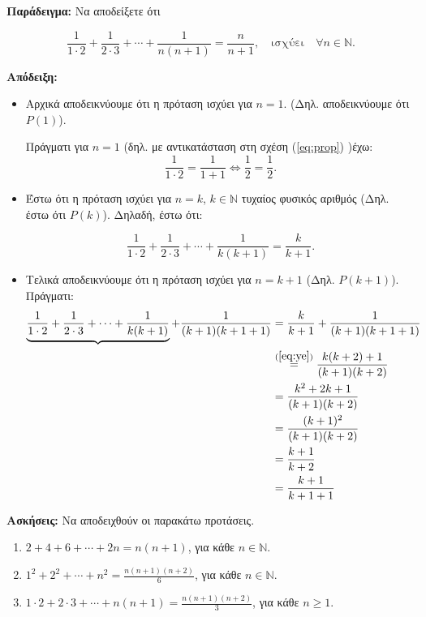 \documentclass[a4paper,12pt]{article}
\begin{document}
\thispagestyle{empty}

\begin{center}
\end{center}

\vspace{1cm}


\textbf{Παράδειγμα:} Να αποδείξετε ότι 

\begin{equation}\label{eq:prop}
\frac{1}{1\cdot 2}+\frac{1}{2\cdot 3}+\cdots + \frac{1}{n(n+1)} = \frac{n}{n+1}, \quad \text{ισχύει} \quad \forall n\in \mathbb{N}.
\end{equation}

\textbf{Απόδειξη:}

\begin{itemize}
\item Αρχικά αποδεικνύουμε ότι η πρόταση ισχύει για $n=1$. (Δηλ. αποδεικνύουμε ότι $P(1)$).

Πράγματι για $n=1$ (δηλ. με αντικατάσταση στη σχέση (\ref{eq:prop}) )έχω: 
\[
\frac{1}{1\cdot 2} = \frac{1}{1+1} \Leftrightarrow \frac{1}{2}=\frac{1}{2}.
\]
\item Έστω ότι η πρόταση ισχύει για $n=k$, $k\in \mathbb{N}$ τυχαίος φυσικός αριθμός (Δηλ. έστω ότι $P(k)$).
Δηλαδή, έστω ότι:  

\begin{equation}\label{eq:ye}
\frac{1}{1\cdot 2}+\frac{1}{2\cdot 3}+\cdots + \frac{1}{k(k+1)} = \frac{k}{k+1}.
\end{equation}

\item Τελικά αποδεικνύουμε ότι η πρόταση ισχύει για $n=k+1$ (Δηλ. $P(k+1)$). Πράγματι: 
\begin{align*}
\underbrace{\frac{1}{1\cdot 2}+\frac{1}{2\cdot 3}+\cdots +\frac{1}{k(k+1)}}+\frac{1}{(k+1)(k+1+1)} &= \frac{k}{k+1}+\frac{1}{(k+1)(k+1+1)} \\
&\overset{(\ref{eq:ye})}{=} \frac{k(k+2)+1}{(k+1)(k+2)}  \\
&=  \frac{k^2+2k+1}{(k+1)(k+2)}  \\ 
&=  \frac{(k+1)^2}{(k+1)(k+2)}  \\
&=  \frac{k+1}{k+2}  \\ 
&=  \frac{k+1}{k+1+1}
\end{align*}
\end{itemize}

\vspace{1cm}

\textbf{Ασκήσεις:} Να αποδειχθούν οι παρακάτω προτάσεις.
\begin{enumerate}
\item $2+4+6+\cdots +2n = n(n+1)$, για κάθε $n\in \mathbb{N}$.
\item $1^2+2^2+\cdots +n^2 = \frac{n(n+1)(n+2)}{6}$, για κάθε $n\in \mathbb{N}$.
\item $1\cdot 2 + 2\cdot 3 +\cdots + n(n+1) = \frac{n(n+1)(n+2)}{3}$, για κάθε $n\geq 1$.
\end{enumerate}
\end{document}
